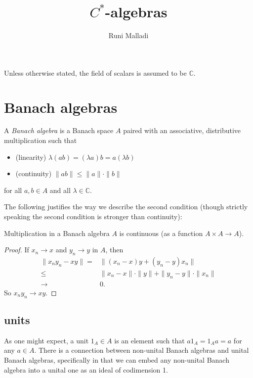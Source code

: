 \documentclass[12pt]{article}
\title{$C^\ast$-algebras}
\author{Runi Malladi}
\begin{document}
\maketitle

Unless otherwise stated, the field of scalars is assumed to be $\mathbb{C}$.

\section{Banach algebras} %

\begin{definition}
	A \emph{Banach algebra} is a Banach space $A$ paired with an associative, distributive multiplication such that 
	\begin{itemize}
		\item (linearity) $\lambda(ab) = (\lambda a)b = a(\lambda b)$
		\item (continuity) $\|ab\| \leq \|a\|\cdot\|b\|$
	\end{itemize}
	for all $a,b\in A$ and all $\lambda\in\mathbb{C}$.
\end{definition}

The following justifies the way we describe the second condition (though strictly speaking the second condition is stronger than continuity):

\begin{proposition}
	Multiplication in a Banach algebra $A$ is continuous (as a function $A\times A\to A$).
\end{proposition}
\begin{proof}
	If $x_n\to x$ and $y_n\to y$ in $A$, then 
	\begin{align*}
		\|x_ny_n - xy\| =& \|(x_n-x)y + (y_n-y)x_n\| \\
		\leq& \|x_n-x\|\cdot\|y\| + \|y_n-y\|\cdot\|x_n\| \\
		\to& 0.
	\end{align*}
	So $x_ny_n\to xy$.
\end{proof}

\subsection{units} %

As one might expect, a unit $1_A\in A$ is an element such that $a1_A=1_Aa=a$ for any $a\in A$. There is a connection between non-unital Banach algebras and unital Banach algebras, specifically in that we can embed any non-unital Banach algebra into a unital one as an ideal of codimension 1.
\end{document}
